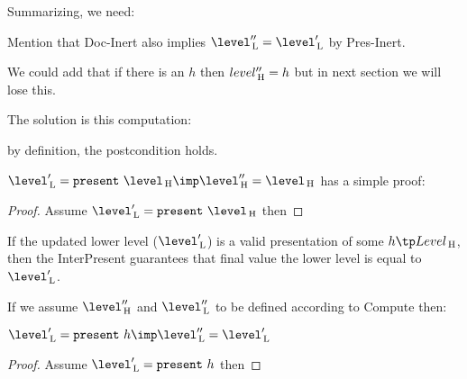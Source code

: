 Summarizing, we need:


Mention that {\sc Doc-Inert} also implies $\level''\L = \level'\L$ by {\sc Pres-Inert}.

We could add that if there is an $h$ then $level''_{\, \mathrm H} = h$ but in next section we will lose this.

The solution is this computation: 



by definition, the postcondition holds.


$\level'\L = \present~\level\H \imp \level''\H = \level\H$ has a simple proof:


\begin{proof} Assume $\level'\L = \present~\level\H$ then
\end{proof}


If the updated lower level ($\level'\L$) is a valid presentation of some $h \tp Level\H$, then the {\sc InterPresent} guarantees that final value the lower level is equal to $\level'\L$.

If we assume $\level''\H$ and $\level''\L$ to be defined according to {\sc Compute} then:

$\level'\L = \present~h \imp \level''\L = \level'\L$

\begin{proof} Assume $\level'\L = \present~h$ then
\end{proof}


